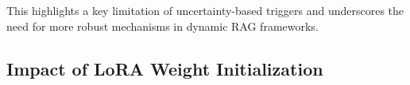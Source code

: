 \documentclass[sigconf,natbib=true,anonymous=false]{acmart}
\begin{document}
This highlights a key limitation of uncertainty-based triggers and underscores the need for more robust mechanisms in dynamic RAG frameworks.






























\subsection{Impact of LoRA Weight Initialization}
\label{ablation:init}
\end{document}
